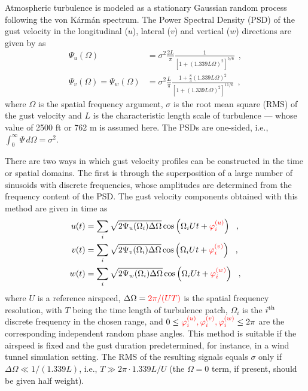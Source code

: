 \documentclass[12pt,a4paper,oneside,english]{abntex2} %
\newcommand{\fix}[1]{{\color{red}#1}}
\def\lp{\left(}
\def\rp{\right)}
\begin{document}
Atmospheric turbulence is modeled as a stationary Gaussian random process following the von Kármán spectrum. The Power Spectral Density (PSD) of the gust velocity in the longitudinal ($u$), lateral ($v$) and vertical ($w$) directions are given by  as
\begin{align}
    \Psi_{u}(\Omega) &= {\sigma}^2\frac{2L}{\pi}\frac{1}{[1+(1.339L\Omega)^2]^{5/6}} \ \ ,
    \\
    \Psi_{v}(\Omega) = \Psi_{w}(\Omega) &= {\sigma}^2\frac{L}{\pi}\frac{1+\frac{8}{3}(1.339L\Omega)^2}{[1+(1.339L\Omega)^2]^{11/6}} \ \ ,
    \label{eq:vkpsd_vw} 
\end{align}
where $\Omega$ is the spatial frequency argument, $\sigma$ is the root mean square (RMS) of the gust velocity and $L$ is the characteristic length scale of turbulence --- whose value of 2500 ft or 762 m is assumed here. \fix{The PSDs are one-sided, i.e., $\int_0^\infty\Psi\,d\Omega=\sigma^2$.}

There are two ways in which gust velocity profiles can be constructed in the time or spatial domains. The first is through the superposition of a large number of sinusoids with discrete frequencies, whose amplitudes are determined from the frequency content of the PSD. The gust velocity components obtained with this method are given in time as
\begin{align}
    u(t) &= \sum_{i} \sqrt{2\Psi_{u}(\Omega_i)\Delta\Omega} \cos\lp\Omega_i Ut+\fix{\varphi_i^{(u)}}\rp \ \ ,
    \label{eq:ugvk_sinusoids}
    \\
    v(t) &= \sum_{i} \sqrt{2\Psi_{v}(\Omega_i)\Delta\Omega} \cos\lp\Omega_i Ut+\fix{\varphi_i^{(v)}}\rp \ \ ,
    \label{eq:vgvk_sinusoids}
    \\
    w(t) &= \sum_{i} \sqrt{2\Psi_{w}(\Omega_i)\Delta\Omega} \cos\lp\Omega_i Ut+\fix{\varphi_i^{(w)}}\rp \ \ ,
    \label{eq:wgvk_sinusoids} 
\end{align}
where $U$ is a reference airspeed, $\Delta\Omega = \fix{2\pi/(UT)}$ is the spatial frequency resolution, with $T$ being the time length of turbulence patch, $\Omega_i$ is the $i\textsuperscript{th}$ discrete frequency in the chosen range, and $0 \leq\fix{\varphi_i^{(u)},\varphi_i^{(v)},\varphi_i^{(w)}}\leq2\pi$ are the corresponding \fix{independent} random phase angles. This method is suitable if the airspeed is fixed and the gust duration predetermined, for instance, in a wind tunnel simulation setting. \fix{The RMS of the resulting signals equals $\sigma$ only if $\Delta\Omega\ll1/(1.339L)$, i.e., $T\gg 2\pi\cdot1.339L/U$ (the $\Omega=0$ term, if present, should be given half weight).}
\end{document}
